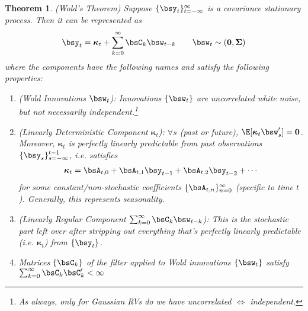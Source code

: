 \documentclass[12pt]{article}
\theoremstyle{plain}
\newtheorem{thm}{Theorem}[section]
\theoremstyle{definition}
\theoremstyle{remark}
\newcommand{\bsSigma}{\boldsymbol{\Sigma}}
\newcommand{\bskappa}{\boldsymbol{\kappa}}
\renewcommand{\bso}{\boldsymbol{0}}
\newcommand{\ninfz}{_{n=0}^\infty}
\begin{document}
\begin{thm}\emph{(Wold's Theorem)}
Suppose $\{\bsy_t\}_{t=-\infty}^\infty$ is a covariance stationary process.
Then it can be represented as
\begin{align*}
  \bsy_t = \bskappa_t + \sum_{k=0}^\infty \bsC_k \bsw_{t-k}
  \qquad \bsw_t\sim(\bso,\bsSigma)
\end{align*}
where the components have the following names and satisfy the following
properties:
\begin{enumerate}[label=\emph{(\roman*)}]
  \item \emph{(Wold Innovations $\bsw_t$):}
    Innovations $\{\bsw_t\}$ are uncorrelated white noise, but
    \emph{not} necessarily independent.\footnote{%
      As always, only for Gaussian RVs do we have uncorrelated $\iff$
      independent.
    }
  \item
    \emph{(Linearly Deterministic Component $\bskappa_t$)}:
    $\forall s$ (past or future), $\E[\bskappa_t\bsw_s']=\bso$.
    Moreover, $\bskappa_t$ is perfectly linearly predictable from
    past observations $\{\bsy_s\}_{s=-\infty}^{t-1}$, i.e. satisfies
    \begin{align*}
      \bskappa_t =
      \bsA_{t,0}
      + \bsA_{t,1}\bsy_{t-1}
      + \bsA_{t,2}\bsy_{t-2}
      + \cdots
    \end{align*}
    for some constant/non-stochastic coefficients
    $\{\bsA_{t,n}\}\ninfz$ (specific to time $t$).
    Generally, this represents seasonality.
  \item \emph{(Linearly Regular Component $\sum_{k=0}^\infty \bsC_k \bsw_{t-k}$):}
    This is the stochastic part left over after stripping out
    everything that's perfectly linearly predictable (i.e. $\bskappa_t$)
    from $\{\bsy_t\}$.
  \item
    Matrices $\{\bsC_k\}$ of the filter applied to Wold innovations
    $\{\bsw_t\}$ satisfy $\sum_{k=0}^\infty \bsC_k\bsC_k'<\infty$
\end{enumerate}
\end{thm}
\end{document}
